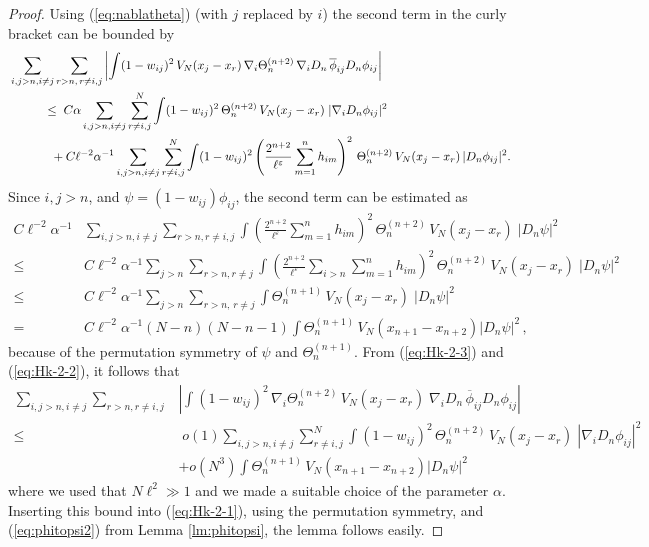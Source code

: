 \documentclass[11pt]{article}
\newcommand{\eps}{\varepsilon}
\renewcommand{\a}{\alpha}
\begin{document}
\begin{proof}
Using (\ref{eq:nablatheta}) (with $j$ replaced by $i$) the second
term in the curly bracket can be bounded by
\begin{equation}\label{eq:Hk-2-2}
\begin{split}
&\sum_{i,j > n, i\neq j} \sum_{r>n , \, r \neq i,j} \left|\int (1-
w_{ij})^2 \, V_N (x_j -x_r)\, \nabla_i \Theta^{(n+2)}_n \,  \nabla_i
D_n \, \overline{\phi}_{ij} D_n \phi_{ij}
\right| \\
&\hspace{1cm}\leq \; C \a \sum_{i,j > n, i\neq j} \sum^N_{r \neq
i,j} \int (1- w_{ij})^2 \, \Theta^{(n+2)}_n \, V_N (x_j -x_r) \;
|\nabla_i D_n \phi_{ij}|^2 \\ &\hspace{1.2cm} +C \ell^{-2} \a^{-1}
\sum_{i,j
> n, i\neq j} \sum^N_{r \neq i,j} \int (1- w_{ij})^2 \left(
\frac{2^{n+2}}{\ell^{\eps}} \sum_{m=1}^n h_{im} \right)^2 \,
\Theta^{(n+2)}_n \, V_N (x_j -x_r) \,  |D_n \phi_{ij}|^2.
\end{split}
\end{equation}
Since $i,j >n$,  and $\psi = (1-w_{ij})\phi_{ij}$, the second term
can be estimated as
\begin{equation}\label{eq:Hk-2-3}
\begin{split}
C \ell^{-2} \a^{-1} &\sum_{i,j > n, i\neq j} \sum_{r>n, r \neq i,j}
\int \left( \frac{2^{n+2}}{\ell^{\eps}} \sum_{m=1}^n h_{im}
\right)^2 \, \Theta^{(n+2)}_n \, V_N (x_j -x_r) \; | D_n \psi|^2 \\
\leq \;& C \ell^{-2} \a^{-1} \sum_{j
> n} \sum_{r>n, r \neq j} \int \left(
\frac{2^{n+2}}{\ell^{\eps}} \sum_{i >n} \sum_{m=1}^n h_{im}
\right)^2 \, \Theta^{(n+2)}_n \, V_N (x_j -x_r) \; |D_n \psi|^2 \\
\leq \; &C \ell^{-2} \a^{-1} \sum_{j
> n} \sum_{r>n, \, r \neq j} \int \Theta^{(n+1)}_{n} \, V_N (x_j
-x_r) \; |D_n \psi|^2
\\ = \; &C \ell^{-2} \a^{-1} (N-n) (N-n-1) \int
\Theta^{(n+1)}_n \, V_N (x_{n+1} - x_{n+2}) |D_n \psi|^2 \, ,
\end{split}
\end{equation}
because of the permutation symmetry of $\psi$ and
$\Theta_n^{(n+1)}$. {F}rom (\ref{eq:Hk-2-3}) and (\ref{eq:Hk-2-2}),
it follows that
\begin{equation}\label{eq:Hk-2-4}
\begin{split}
\sum_{i,j > n, i\neq j} \sum_{r>n, r \neq i,j} &\left|\int (1-
w_{ij})^2 \, \nabla_i \Theta^{(n+2)}_n \, V_N (x_j -x_r) \; \nabla_i
D_n \, \overline{\phi}_{ij} D_n \phi_{ij} \right|
\\ \leq &\;
o(1) \sum_{i,j > n, i\neq j} \sum^N_{r \neq i,j} \int (1- w_{ij})^2
\, \Theta^{(n+2)}_n \, V_N (x_j -x_r) \; |\nabla_i D_n \phi_{ij}|^2
\\ &+ o(N^3)\int \Theta^{(n+1)}_{n} \, V_N
(x_{n+1} - x_{n+2}) |D_n \psi|^2
\end{split}
\end{equation}
where we used that $N \ell^2 \gg 1$ and we made a suitable choice of
the parameter $\a$. Inserting this bound into (\ref{eq:Hk-2-1}),
using the permutation symmetry, and (\ref{eq:phitopsi2}) from Lemma
\ref{lm:phitopsi}, the lemma follows easily.
\end{proof}
\end{document}
